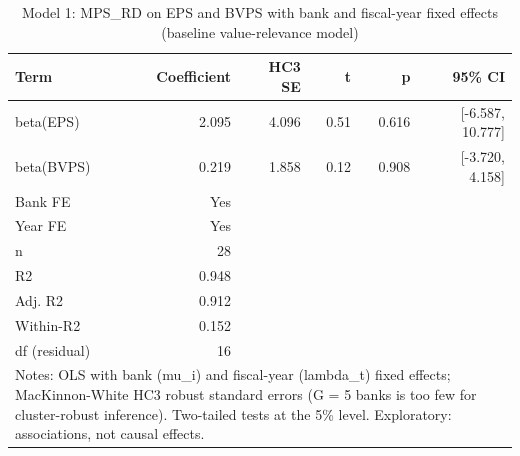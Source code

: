 \begin{table}[htbp]
\centering
\caption{Model 1: MPS\_RD on EPS and BVPS with bank and fiscal-year fixed effects (baseline value-relevance model)}
\label{tab:t3_model1}
\begin{tabular}{lrrrrr}
\toprule
Term & Coefficient & HC3 SE & t & p & 95\% CI \\
\midrule
beta(EPS) & 2.095 & 4.096 & 0.51 & 0.616 & [-6.587, 10.777] \\
beta(BVPS) & 0.219 & 1.858 & 0.12 & 0.908 & [-3.720, 4.158] \\
Bank FE & Yes &  &  &  &  \\
Year FE & Yes &  &  &  &  \\
n & 28 &  &  &  &  \\
R2 & 0.948 &  &  &  &  \\
Adj. R2 & 0.912 &  &  &  &  \\
Within-R2 & 0.152 &  &  &  &  \\
df (residual) & 16 &  &  &  &  \\
\midrule
\multicolumn{6}{l}{\footnotesize Notes: OLS with bank (mu\_i) and fiscal-year (lambda\_t) fixed effects; MacKinnon-White HC3 robust standard errors (G = 5 banks is too few for cluster-robust inference). Two-tailed tests at the 5\% level. Exploratory: associations, not causal effects.} \\
\bottomrule
\end{tabular}
\end{table}

